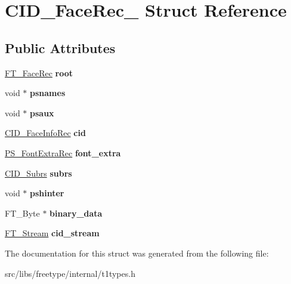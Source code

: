 \hypertarget{struct_c_i_d___face_rec__}{
\section{CID\_\-FaceRec\_\- Struct Reference}
\label{struct_c_i_d___face_rec__}
}
\subsection*{Public Attributes}
\begin{DoxyCompactItemize}
\item 
\hypertarget{struct_c_i_d___face_rec___aeeb09d3feaa016b664e1c5bf95a6f232}{
\hyperlink{struct_f_t___face_rec__}{FT\_\-FaceRec} {\bfseries root}}
\label{struct_c_i_d___face_rec___aeeb09d3feaa016b664e1c5bf95a6f232}

\item 
\hypertarget{struct_c_i_d___face_rec___ab87e41e70c9aa0c32382ce43dda8b32a}{
void $\ast$ {\bfseries psnames}}
\label{struct_c_i_d___face_rec___ab87e41e70c9aa0c32382ce43dda8b32a}

\item 
\hypertarget{struct_c_i_d___face_rec___a8e8c0efc67577803cef0f73fc114470d}{
void $\ast$ {\bfseries psaux}}
\label{struct_c_i_d___face_rec___a8e8c0efc67577803cef0f73fc114470d}

\item 
\hypertarget{struct_c_i_d___face_rec___a00bc02f259a47704eb471d38c573bd4c}{
\hyperlink{struct_c_i_d___face_info_rec__}{CID\_\-FaceInfoRec} {\bfseries cid}}
\label{struct_c_i_d___face_rec___a00bc02f259a47704eb471d38c573bd4c}

\item 
\hypertarget{struct_c_i_d___face_rec___aba208398d42242870890625f993caa81}{
\hyperlink{struct_p_s___font_extra_rec__}{PS\_\-FontExtraRec} {\bfseries font\_\-extra}}
\label{struct_c_i_d___face_rec___aba208398d42242870890625f993caa81}

\item 
\hypertarget{struct_c_i_d___face_rec___aa842e3eb5a5092dd0fc2c0ecf7bd692b}{
\hyperlink{struct_c_i_d___subrs_rec__}{CID\_\-Subrs} {\bfseries subrs}}
\label{struct_c_i_d___face_rec___aa842e3eb5a5092dd0fc2c0ecf7bd692b}

\item 
\hypertarget{struct_c_i_d___face_rec___a8a367e497f72f4d0384103952d73fc08}{
void $\ast$ {\bfseries pshinter}}
\label{struct_c_i_d___face_rec___a8a367e497f72f4d0384103952d73fc08}

\item 
\hypertarget{struct_c_i_d___face_rec___a42f458adc70ad63807dbe63b8b694da2}{
FT\_\-Byte $\ast$ {\bfseries binary\_\-data}}
\label{struct_c_i_d___face_rec___a42f458adc70ad63807dbe63b8b694da2}

\item 
\hypertarget{struct_c_i_d___face_rec___a2be5991aa14a8f599c02b1cdfc547e25}{
\hyperlink{struct_f_t___stream_rec__}{FT\_\-Stream} {\bfseries cid\_\-stream}}
\label{struct_c_i_d___face_rec___a2be5991aa14a8f599c02b1cdfc547e25}

\end{DoxyCompactItemize}


The documentation for this struct was generated from the following file:\begin{DoxyCompactItemize}
\item 
src/libs/freetype/internal/t1types.h\end{DoxyCompactItemize}
